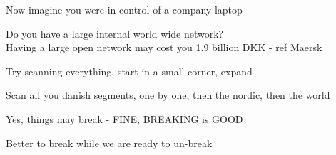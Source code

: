 \documentclass[Screen16to9,17pt,footrule]{foils}
\begin{document}

Now imagine you were in control of a company laptop

\begin{list2}
\item Do you have a large internal world wide network?\\
Having a large open network may cost you 1.9 billion DKK - ref Maersk
\item Try scanning everything, start in a small corner, expand
\item Scan all you danish segments, one by one, then the nordic, then the world
\item Yes, things may break - FINE, BREAKING is GOOD
\end{list2}

\centerline{Better to break while we are ready to un-break}


\myquestionspage
\end{document}

